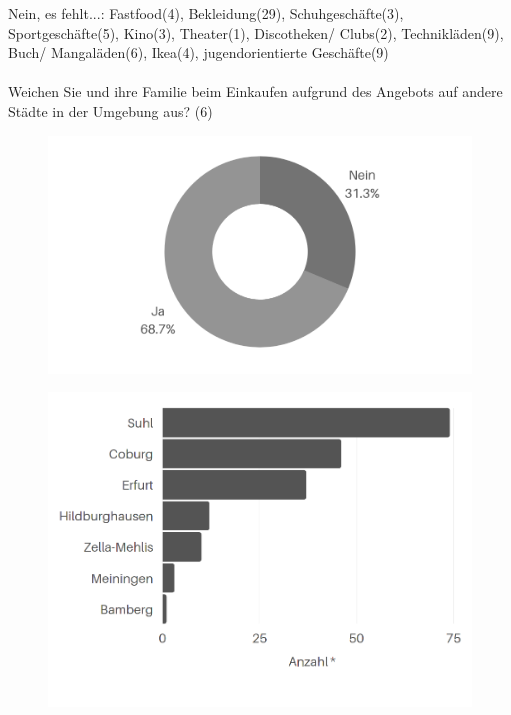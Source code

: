 Nein, es fehlt...: Fastfood(4), Bekleidung(29), Schuhgeschäfte(3), Sportgeschäfte(5), Kino(3), Theater(1), Discotheken/ Clubs(2), Technikläden(9), Buch/ Mangaläden(6), Ikea(4), jugendorientierte Geschäfte(9)\\\\
\fi
\newpage\noindent Weichen Sie und ihre Familie beim Einkaufen aufgrund des Angebots auf andere Städte in der Umgebung aus? (6)\\

\begin{figure}[H]
    \begin{center}
        \includegraphics[width=12cm]{media/schuelerumfrage/6.1.png}
    \end{center}
\end{figure}

\begin{figure}[H]
    \begin{center}
        \includegraphics[width=12cm]{media/schuelerumfrage/6.2.png}
    \end{center}
\end{figure}

